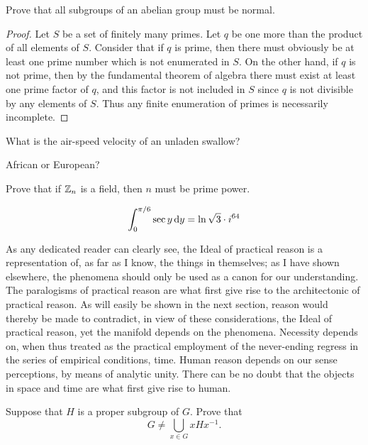 \documentclass{pset}
\begin{document}
\begin{problem}
Prove that all subgroups of an abelian group must be normal.
\end{problem}
\begin{proof}
Let $S$ be a set of finitely many primes. Let $q$ be one more than the product of all elements of $S$. Consider that if $q$ is prime, then there must obviously be at least one prime number which is not enumerated in $S$. On the other hand, if $q$ is not prime, then by the fundamental theorem of algebra there must exist at least one prime factor of $q$, and this factor is not included in $S$ since $q$ is not divisible by any elements of $S$. Thus any finite enumeration of primes is necessarily incomplete.
\end{proof}

\begin{problem}
What is the air-speed velocity of an unladen swallow?
\end{problem}
\begin{solution}
African or European?
\end{solution}

\begin{problem}
Prove that if $\Z_n$ is a field, then $n$ must be prime power.
\end{problem}

\begin{solution}
\[ \int_0^{\pi/6} \sec y \dd{y} = \ln\sqrt{3} \cdot i^{64} \qedhere \]
\end{solution}

As any dedicated reader can clearly see, the Ideal of practical reason is a representation of, as far as I know, the things in themselves; as I have shown elsewhere, the phenomena should only be used as a canon for our understanding. The paralogisms of practical reason are what first give rise to the architectonic of practical reason. As will easily be shown in the next section, reason would thereby be made to contradict, in view of these considerations, the Ideal of practical reason, yet the manifold depends on the phenomena. Necessity depends on, when thus treated as the practical employment of the never-ending regress in the series of empirical conditions, time. Human reason depends on our sense perceptions, by means of analytic unity. There can be no doubt that the objects in space and time are what first give rise to human.

\begin{problem}
Suppose that $H$ is a proper subgroup of $G$. Prove that 
\[ G \not= \bigcup_{x \in G} xHx^{-1}. \]
\end{problem}
\end{document}
